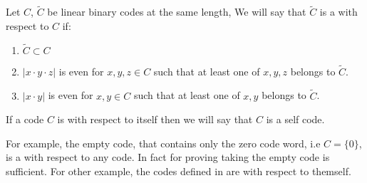 \begin{definition}
  \label{def:trig}
  Let $C$, $\tilde{C}$ be linear binary codes at the same length, We will say that $\tilde{C}$ is a \trig with respect to $C$ if: 
  \begin{enumerate}
    \item $\tilde{C} \subset C$
    \item $|x\cdot y \cdot z|$ is even for $x,y,z \in C$ such that at least one of $x,y,z$  belongs to $\tilde{C}$. 
    \item $|x\cdot y|$ is even for $x,y \in C$ such that at least one of $x,y$  belongs to $\tilde{C}$. 
  \end{enumerate}
  If a code $C$ is \trig with respect to itself then we will say that $C$ is a self \trig code. 
\end{definition}
For example, the empty code, that contains only the zero code word, i.e $C = \{ 0 \}$, is a \trig with respect to any code. In fact for proving  taking the empty code is sufficient. For other example, the \trig codes defined in \cite{bravyi2012magic} are \trig with respect to themself. 

